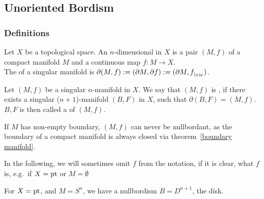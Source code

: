\documentclass[a4paper,11pt]{article}
\begin{document}

\subsection{Unoriented Bordism}\label{Kap unor. Bordism}
\subsubsection{Definitions}

\begin{definition}\label{singular manifold}
    Let \(X\) be a topological space. An \(n\)-dimensional  in \(X\) is a pair \((M,f)\) of a compact manifold \(M\) and a continuous map \(f:M\to X\).\\
    The  of a singular manifold is \(\partial(M,f):=(\partial M, \partial f):=(\partial M,f_{|_{\partial M}})\).
\end{definition}

\begin{definition}
    Let \((M,f)\) be a singular \(n\)-manifold in \(X\). We say that \((M,f)\) is , if there exists a singular (\(n+1\))-manifold \((B,F)\) in \(X\), such that \(\partial(B,F)=(M,f)\).\\
    \(B,F\) is then called a  of \((M,f)\).
\end{definition}

\begin{remark}
    If \(M\) has non-empty boundary, \((M,f)\) can never be nullbordant, as the boundary of a compact manifold is always closed via theorem\ \ref{boundary manifold}.
\end{remark}

In the following, we will sometimes omit \(f\) from the notation, if it is clear, what \(f\) is, e.g.\ if \(X=\mathrm{pt}\) or \(M=\emptyset\)

\begin{example}
    For \(X=\mathrm{pt}\), and \(M=S^n\), we have a nullbordism \(B=D^{n+1}\), the disk.%
\end{example}
\end{document}

